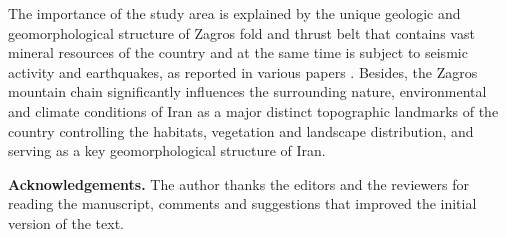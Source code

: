 \documentclass[12pt,a4paper,oneside]{article}
\def \newsection{\vspace{12pt}\textbf}
\def \newpar{\vspace{6pt}}
\begin{document}
\newpar The importance of the study area is explained by the unique geologic and geomorphological structure of Zagros fold and thrust belt that contains vast mineral resources of the country \citep{Sepehr,Regard,Motaghi2017,Saura} and at the same time is subject to seismic activity and earthquakes, as reported in various papers \citep{Paul,Nissen,Yamini,Tavakoli,Talebian}. Besides, the Zagros mountain chain significantly influences the surrounding nature, environmental and climate conditions of Iran as a major distinct topographic landmarks of the country controlling the habitats, vegetation and landscape distribution, and serving as a key geomorphological structure of Iran. 

\vspace{12pt}

{\bf Acknowledgements.} The author thanks the editors and the reviewers for reading the manuscript, comments and suggestions that improved the initial version of the text.


%
%
%


\end{document}
